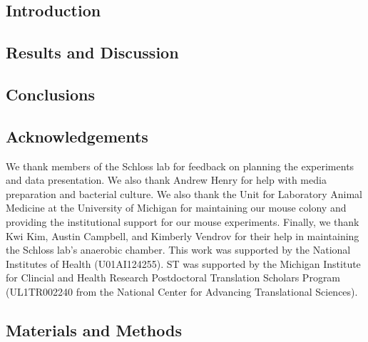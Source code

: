 \documentclass[
  11pt,
]{article}
\begin{document}
\newpage

\hypertarget{introduction}{%
\subsection{Introduction}\label{introduction}}

\hypertarget{results-and-discussion}{%
\subsection{Results and Discussion}\label{results-and-discussion}}

\hypertarget{conclusions}{%
\subsection{Conclusions}\label{conclusions}}

\hypertarget{acknowledgements}{%
\subsection{Acknowledgements}\label{acknowledgements}}

We thank members of the Schloss lab for feedback on planning the
experiments and data presentation. We also thank Andrew Henry for help
with media preparation and bacterial culture. We also thank the Unit for
Laboratory Animal Medicine at the University of Michigan for maintaining
our mouse colony and providing the institutional support for our mouse
experiments. Finally, we thank Kwi Kim, Austin Campbell, and Kimberly
Vendrov for their help in maintaining the Schloss lab's anaerobic
chamber. This work was supported by the National Institutes of Health
(U01AI124255). ST was supported by the Michigan Institute for Clincial
and Health Research Postdoctoral Translation Scholars Program
(UL1TR002240 from the National Center for Advancing Translational
Sciences).

\hypertarget{materials-and-methods}{%
\subsection{Materials and Methods}\label{materials-and-methods}}

\newpage
\end{document}
